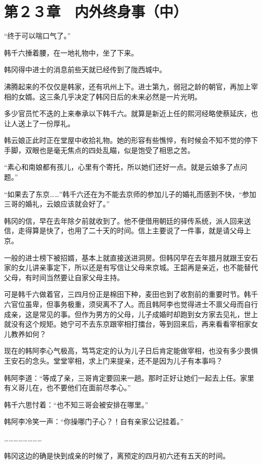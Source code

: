 \section{第２３章　内外终身事（中）}

“终于可以喘口气了。”

韩千六捶着腰，在一地礼物中，坐了下来。

韩冈得中进士的消息前些天就已经传到了陇西城中。

沸腾起来的不仅仅是韩家，还有巩州上下。进士第九，弱冠之龄的朝官，再加上宰相的女婿。这三条几乎决定了韩冈日后的未来必然是一片光明。

多少官员忙不迭的上来奉承以下韩千六。就算是新近上任的熙河经略使蔡延庆，也让人送上了一份厚礼。

韩云娘正此时正在堂屋中收拾礼物。她的形容有些憔悴，有时候会不知不觉的停下手脚，双眼也是毫无焦点的四处乱瞄，似是饱受了相思之苦。

“素心和南娘都有孩儿，心里有个寄托，所以她们还好一点。就是云娘多了点问题。”

“如果去了东京……”韩千六还在为不能去京师的参加儿子的婚礼而感到不快，“参加三哥的婚礼，云娘应该就会好了。”

韩冈的信，早在去年除夕前就收到了。他不便借用朝廷的驿传系统，派人回来送信，走得算是快了，也用了二十天的时间。信上主要说了一件事，就是请父母上京。

一般的进士榜下被招婿，基本上就直接送进洞房。但韩冈早在去年腊月就跟王安石家的女儿讲亲事定下，所以还是有写信让父母来京城。王韶再是亲近，也不能替代父母，有时间当然要让自家父母主持。

可是韩千六做着官，三四月份正是棉田下种，麦田也到了收割前的重要时节。韩千六官位虽卑，但事务极重，须臾离不了人。而且韩阿李也觉得进士不禀父母而自行成亲，这是常见的事。但作为男方的父母，儿子成婚时却跑到女方家去见礼，世上就没有这个规矩。她宁可不去东京跟宰相打擂台，等到回来后，再来看看宰相家女儿教养如何？

现在的韩阿李心气极高，笃笃定定的认为儿子日后肯定能做宰相，也没有多少畏惧王安石的念头。堂堂宰相，求上门来提亲，还不是因为儿子有本事吗？

韩阿李道：“等成了亲，三哥肯定要回来一趟。那时正好让她们一起去上任。家里有义哥儿在，也不要他们在面前尽孝心。”

韩千六思忖着：“也不知三哥会被安排在哪里。”

韩阿李冷笑一声：“你操哪门子心？！自有亲家公记挂着。”

……………………

韩冈这边的确是快到成亲的时候了，离预定的四月初六还有五天的时间。

